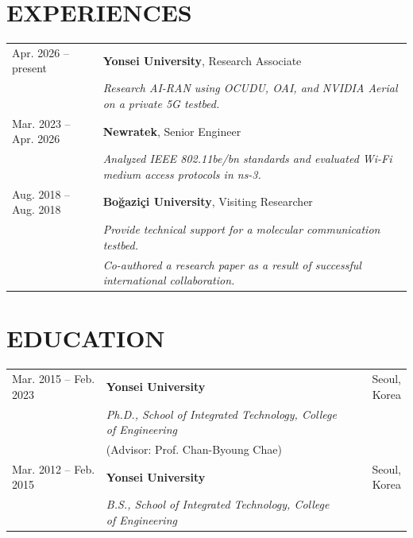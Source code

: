 \documentclass[a4paper,9pt]{extarticle}
\begin{document}
\section*{EXPERIENCES}
\noindent
\begin{tabularx}{\textwidth}{@{} p{3.5cm} X @{}}
    Apr. 2026 -- present    & \textbf{Yonsei University}, Research Associate \\
                            & \textit{Research AI-RAN using OCUDU, OAI, and NVIDIA Aerial on a private 5G testbed.} \\ \addlinespace[0.5em]

    Mar. 2023 -- Apr. 2026  & \textbf{Newratek}, Senior Engineer \\
                            & \textit{Analyzed IEEE 802.11be/bn standards and evaluated Wi-Fi medium access protocols in ns-3.} \\ \addlinespace[0.5em]
    
    Aug. 2018 -- Aug. 2018 & \textbf{Boğaziçi University}, Visiting Researcher \\
                            & \textit{Provide technical support for a molecular communication testbed. } \\
                            & \textit{Co-authored a research paper as a result of successful international collaboration.} \\
\end{tabularx}

\section*{EDUCATION}
\noindent
\begin{tabular*}{\textwidth}{@{\extracolsep{\fill}} ll r}
    Mar. 2015 -- Feb. 2023 & \textbf{Yonsei University} & Seoul, Korea \\
    & \textit{Ph.D., School of Integrated Technology, College of Engineering} & \\
    & (Advisor: Prof. Chan-Byoung Chae) & \\[0.5em] %
    
    Mar. 2012 -- Feb. 2015 & \textbf{Yonsei University} & Seoul, Korea \\
    & \textit{B.S., School of Integrated Technology, College of Engineering} & \\
\end{tabular*}

\end{document}
